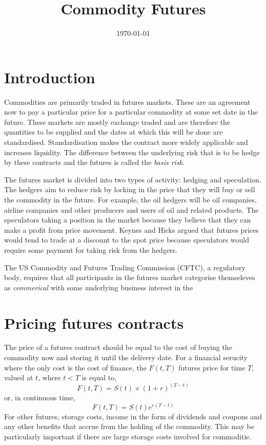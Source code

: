 \documentclass[12pt, a4paper, oneside]{article}\usepackage{graphicx, color}
\begin{document}
\title{Commodity Futures}
\date{\today}
\maketitle
\section*{Introduction}
Commodities are primarily traded in futures markets.  These are an agreement now to pay a particular price for a particular commodity at some set date in the future. These markets are mostly exchange traded and are therefore the quantities to be supplied and the dates at which this will be done are standardised.  Standardisation makes the contract more widely applicable and increases liquidity.  The difference between the underlying risk that is to be hedge by these contracts and the futures is called the \emph{basis risk}.  

The futures market is divided into two types of activity:  hedging and speculation.  The hedgers aim to reduce risk by locking in the price that they will buy or sell the commodity in the future.  For example, the oil hedgers will be oil companies, airline companies and other producers and users of oil and related products. The speculators taking a position in the market because they believe that they can make a profit from price movement.  Keynes and Hicks argued that futures prices would tend to trade at a discount to the spot price because speculators would require some payment for taking risk from the hedgers. 

The US Commodity and Futures Trading Commission (CFTC), a regulatory body, requires that all participants in the futures market categorise themseleves as \emph{commerical} with some underlying business interest in the 

\section*{Pricing futures contracts}
The price of a futures contract should be equal to the cost of buying the commodity now and storing it until the delivery date.  For a financial serucity where the only cost is the cost of finance, the $F(t, T)$ futures price for time $T$, valued at $t$, where $t<T$ is equal to, 
\begin{equation*}
F(t, T) = S(t) \times (1 +r)^{(T-t)}
\end{equation*}
or, in continuous time, 
\begin{equation*}
F(t, T) = S(t)e^{r(T-t)}
\end{equation*}
For other futures, storage costs, income in the form of dividends and coupons and any other benefits that accrue from the holding of the commodity. This may be particularly important if there are large storage costs involved for commoditie. 
\end{document}
